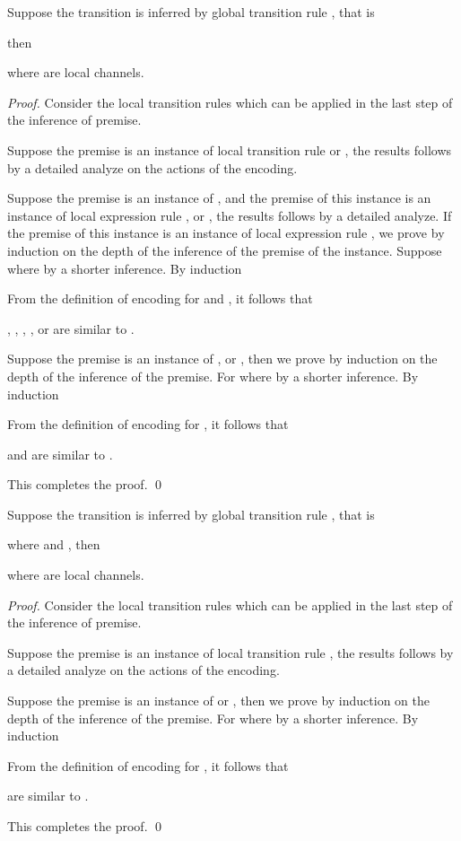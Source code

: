 \documentclass[runningheads, envcountsame, a4paper]{llncs}
\begin{document}
\begin{proposition}
  Suppose the transition is inferred by global transition rule , that is
  
  then
  
  where  are local channels.
\end{proposition}
\begin{proof}
Consider the local transition rules which can be applied in the last step of the inference of premise.

Suppose the premise is an instance of local transition rule  or ,
the results follows by a detailed analyze on the actions of the encoding.

Suppose the premise is an instance of , and the premise of this instance is an instance
of local expression rule ,  or , the results follows by a detailed analyze.
If the premise of this instance is an instance of local expression rule ,
we prove by induction on the depth of the inference of the premise of the instance.
Suppose  where  by a shorter inference.
By induction

From the definition of encoding for  and , it follows that

, , , , or  are similar to .

Suppose the premise is an instance of ,  or ,
then we prove by induction on the depth of the inference of the premise.
For   where
 by a shorter inference. By induction

From the definition of encoding for , it follows that

 and  are similar to .

  This completes the proof. \qed
\end{proof}

\begin{proposition}
  Suppose the transition is inferred by global transition rule , that is
  
  where  and , then
  
  where  are local channels.
\end{proposition}
\begin{proof}
Consider the local transition rules which can be applied in the last step of the inference of premise.

Suppose the premise is an instance of local transition rule ,
the results follows by a detailed analyze on the actions of the encoding.

Suppose the premise is an instance of  or ,
then we prove by induction on the depth of the inference of the premise.
For   where
 by a shorter inference. By induction

From the definition of encoding for , it follows that

 are similar to .

This completes the proof. \qed
\end{proof}
\end{document}
